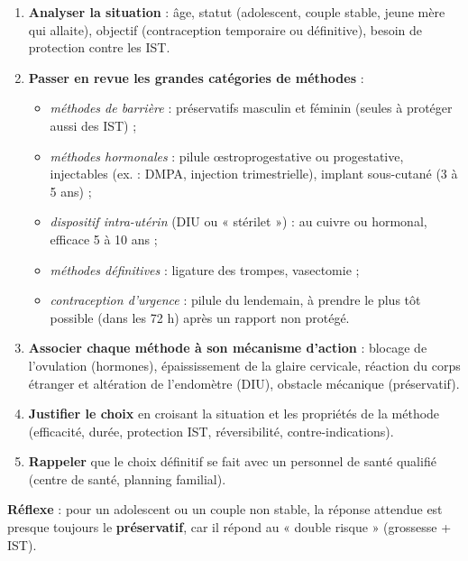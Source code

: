 \documentclass[11pt]{article}
\begin{document}
\begin{methode}
\begin{enumerate}
\item \textbf{Analyser la situation} : âge, statut (adolescent, couple stable, jeune mère qui allaite), objectif (contraception temporaire ou définitive), besoin de protection contre les IST.
\item \textbf{Passer en revue les grandes catégories de méthodes} :
\begin{itemize}
\item \emph{méthodes de barrière} : préservatifs masculin et féminin (seules à protéger aussi des IST) ;
\item \emph{méthodes hormonales} : pilule œstroprogestative ou progestative, injectables (ex. : DMPA, injection trimestrielle), implant sous-cutané (3 à 5 ans) ;
\item \emph{dispositif intra-utérin} (DIU ou « stérilet ») : au cuivre ou hormonal, efficace 5 à 10 ans ;
\item \emph{méthodes définitives} : ligature des trompes, vasectomie ;
\item \emph{contraception d'urgence} : pilule du lendemain, à prendre le plus tôt possible (dans les 72 h) après un rapport non protégé.
\end{itemize}
\item \textbf{Associer chaque méthode à son mécanisme d'action} : blocage de l'ovulation (hormones), épaississement de la glaire cervicale, réaction du corps étranger et altération de l'endomètre (DIU), obstacle mécanique (préservatif).
\item \textbf{Justifier le choix} en croisant la situation et les propriétés de la méthode (efficacité, durée, protection IST, réversibilité, contre-indications).
\item \textbf{Rappeler} que le choix définitif se fait avec un personnel de santé qualifié (centre de santé, planning familial).
\end{enumerate}
\textbf{Réflexe} : pour un adolescent ou un couple non stable, la réponse attendue est presque toujours le \textbf{préservatif}, car il répond au « double risque » (grossesse + IST).
\end{methode}
\end{document}
